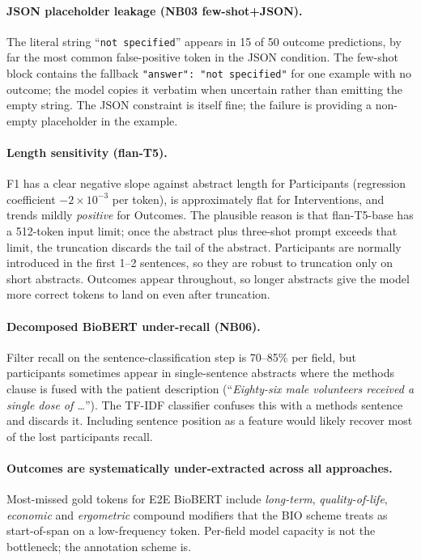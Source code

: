 \documentclass[11pt]{article}
\begin{document}
\paragraph{JSON placeholder leakage (NB03 few-shot+JSON).} The literal
string ``\texttt{not specified}'' appears in 15 of 50 outcome
predictions, by far the most common false-positive token in the JSON
condition. The few-shot block contains the fallback
\texttt{"answer": "not specified"} for one example with no outcome; the
model copies it verbatim when uncertain rather than emitting the empty
string. The JSON constraint is itself fine; the failure is providing a
non-empty placeholder in the example.

\paragraph{Length sensitivity (flan-T5).} F1 has a clear negative slope
against abstract length for Participants (regression coefficient
$-2 \times 10^{-3}$ per token), is approximately flat for Interventions,
and trends mildly \textit{positive} for Outcomes. The plausible reason
is that flan-T5-base has a 512-token input limit; once the abstract
plus three-shot prompt exceeds that limit, the truncation discards the
tail of the abstract. Participants are normally introduced in the first
1--2 sentences, so they are robust to truncation only on short
abstracts. Outcomes appear throughout, so longer abstracts give the
model more correct tokens to land on even after truncation.

\paragraph{Decomposed BioBERT under-recall (NB06).} Filter recall on the
sentence-classification step is 70--85\% per field, but participants
sometimes appear in single-sentence abstracts where the methods clause
is fused with the patient description (``\textit{Eighty-six male
volunteers received a single dose of \dots}''). The TF-IDF classifier
confuses this with a methods sentence and discards it. Including
sentence position as a feature would likely recover most of the lost 
participants recall.

\paragraph{Outcomes are systematically under-extracted across all
approaches.} Most-missed gold tokens for E2E BioBERT include
\textit{long-term}, \textit{quality-of-life}, \textit{economic} and
\textit{ergometric} compound modifiers that the BIO scheme treats
as start-of-span on a low-frequency token. Per-field model capacity is
not the bottleneck; the annotation scheme is.
\end{document}
